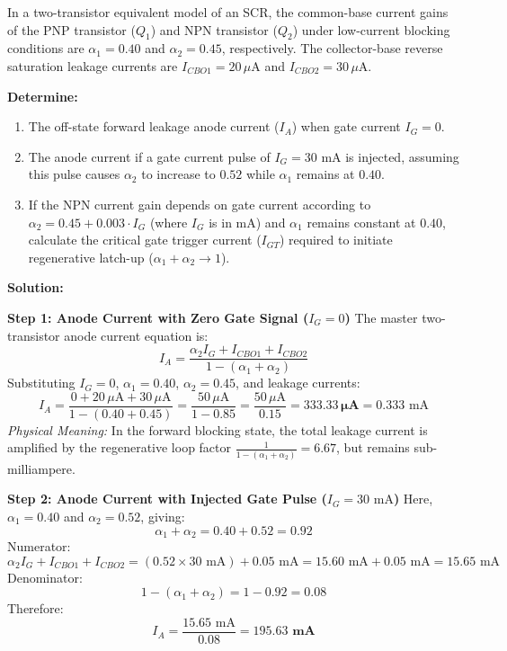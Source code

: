 \documentclass[11pt,a4paper]{article}
\begin{document}
\begin{examplebox}
In a two-transistor equivalent model of an SCR, the common-base current gains of the PNP transistor ($Q_1$) and NPN transistor ($Q_2$) under low-current blocking conditions are $\alpha_1 = 0.40$ and $\alpha_2 = 0.45$, respectively. The collector-base reverse saturation leakage currents are $I_{CBO1} = 20\,\mu\text{A}$ and $I_{CBO2} = 30\,\mu\text{A}$.

\textbf{Determine:}
\begin{enumerate}[label=(\alph*)]
  \item The off-state forward leakage anode current ($I_A$) when gate current $I_G = 0$.
  \item The anode current if a gate current pulse of $I_G = 30\text{ mA}$ is injected, assuming this pulse causes $\alpha_2$ to increase to $0.52$ while $\alpha_1$ remains at $0.40$.
  \item If the NPN current gain depends on gate current according to $\alpha_2 = 0.45 + 0.003 \cdot I_G$ (where $I_G$ is in mA) and $\alpha_1$ remains constant at $0.40$, calculate the critical gate trigger current ($I_{GT}$) required to initiate regenerative latch-up ($\alpha_1 + \alpha_2 \to 1$).
\end{enumerate}

\tcblower
\textbf{Solution:}

\textbf{Step 1: Anode Current with Zero Gate Signal ($I_G = 0$)}
The master two-transistor anode current equation is:
\begin{equation}
I_A = \frac{\alpha_2 I_G + I_{CBO1} + I_{CBO2}}{1 - (\alpha_1 + \alpha_2)}
\end{equation}
Substituting $I_G = 0$, $\alpha_1 = 0.40$, $\alpha_2 = 0.45$, and leakage currents:
\begin{equation}
I_A = \frac{0 + 20\,\mu\text{A} + 30\,\mu\text{A}}{1 - (0.40 + 0.45)} = \frac{50\,\mu\text{A}}{1 - 0.85} = \frac{50\,\mu\text{A}}{0.15} = \mathbf{333.33\,\mu\text{A}} = 0.333\text{ mA}
\end{equation}
\textit{Physical Meaning:} In the forward blocking state, the total leakage current is amplified by the regenerative loop factor $\frac{1}{1 - (\alpha_1 + \alpha_2)} = 6.67$, but remains sub-milliampere.

\textbf{Step 2: Anode Current with Injected Gate Pulse ($I_G = 30\text{ mA}$)}
Here, $\alpha_1 = 0.40$ and $\alpha_2 = 0.52$, giving:
\begin{equation}
\alpha_1 + \alpha_2 = 0.40 + 0.52 = 0.92
\end{equation}
Numerator:
\begin{equation}
\alpha_2 I_G + I_{CBO1} + I_{CBO2} = (0.52 \times 30\text{ mA}) + 0.05\text{ mA} = 15.60\text{ mA} + 0.05\text{ mA} = 15.65\text{ mA}
\end{equation}
Denominator:
\begin{equation}
1 - (\alpha_1 + \alpha_2) = 1 - 0.92 = 0.08
\end{equation}
Therefore:
\begin{equation}
I_A = \frac{15.65\text{ mA}}{0.08} = \mathbf{195.63\text{ mA}}
\end{equation}


\end{examplebox}
\end{document}
